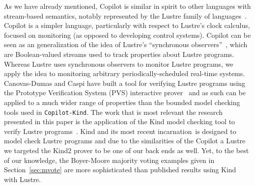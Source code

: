 As we have already mentioned, Copilot is similar in spirit to other
languages with stream-based semantics, notably represented by the
Lustre family of languages~\cite{lustre-intro}.  Copilot is a simpler
language, particularly with respect to Lustre's clock calculus,
focused on monitoring (as opposed to developing control systems).
Copilot can be seen as an generalization of the idea of Lustre's
``synchronous observers''~\cite{Halbwachs93}, which are Boolean-valued
streams used to track properties about Lustre programs.  Whereas
Lustre uses synchronous observers to monitor Lustre programs, we apply
the idea to monitoring arbitrary periodically-scheduled real-time
systems. Canovas-Dumas and Caspi have built a tool for verifying
Lustre programs using the Prototype Verification System (PVS)
interactive prover~\cite{Canovas-Dumas:2000} and as such can be
applied to a much wider range of properties than the bounded model
checking tools used in \texttt{Copilot-Kind}.  The work that is most
relevant the research presented in this paper is the application of
the Kind model checking tool to verify Lustre programs~\cite{Hagen08}.
Kind and its most recent incarnation~\cite{kind2}is designed to model
check Lustre programs and due to the similarities of the Copilot a
Lustre we targeted the Kind2 prover to be one of our back ends as
well.  Yet, to the best of our knowledge, the Boyer-Moore majority
voting examples given in Section~\ref{sec:mvote} are more
sophisticated than published results using Kind with Lustre.
  


